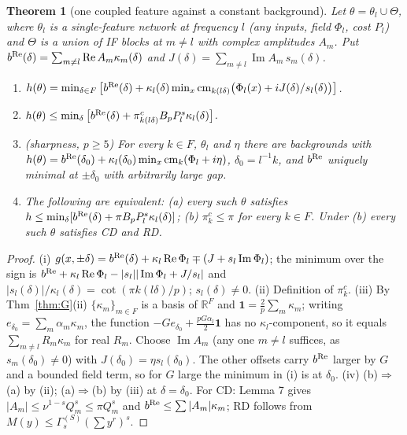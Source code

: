 \documentclass[11pt]{article}
\newtheorem{theorem}{Theorem}
\theoremstyle{remark}
\newcommand{\Re}{\operatorname{Re}}
\newcommand{\Im}{\operatorname{Im}}
\renewcommand{\Re}{\operatorname{Re}}
\renewcommand{\Im}{\operatorname{Im}}
\begin{document}
\begin{theorem}[one coupled feature against a constant background]\label{thm:S}
Let $\theta=\theta_l\cup\Theta$, where $\theta_l$ is a single-feature network at frequency $l$ (any inputs, field $\Phi_l$, cost $P_l$)
and $\Theta$ is a union of IF blocks at $m\ne l$ with complex amplitudes $A_m$.  Put $b^{\rm Re}(\delta)=\sum_{m\ne l}\Re A_m\kappa_m(\delta)$
and $J(\delta)=\sum_{m\ne l}\Im A_m\,s_m(\delta)$.
\begin{enumerate}
\item[(i)] $h(\theta)=\min_{\delta\in F}\big[b^{\rm Re}(\delta)+\kappa_l(\delta)\min_x\mathrm{cm}_{k(l\delta)}\big(\Phi_l(x)+iJ(\delta)/s_l(\delta)\big)\big]$.
\item[(ii)] $h(\theta)\le\min_\delta\big[b^{\rm Re}(\delta)+\pi^c_{k(l\delta)}B_pP_l^s\kappa_l(\delta)\big]$.
\item[(iii)] (sharpness, $p\ge5$) For every $k\in F$, $\theta_l$ and $\eta$ there are backgrounds with
$h(\theta)=b^{\rm Re}(\delta_0)+\kappa_l(\delta_0)\min_x\mathrm{cm}_k(\Phi_l+i\eta)$, $\delta_0=l^{-1}k$, and $b^{\rm Re}$ uniquely minimal at
$\pm\delta_0$ with arbitrarily large gap.
\item[(iv)] The following are equivalent: (a) every such $\theta$ satisfies $h\le\min_\delta[b^{\rm Re}(\delta)+\pi B_pP_l^s\kappa_l(\delta)]$;
(b) $\pi^c_k\le\pi$ for every $k\in F$.  Under (b) every such $\theta$ satisfies CD and RD.
\end{enumerate}
\end{theorem}
\begin{proof}
(i) $g(x,\pm\delta)=b^{\rm Re}(\delta)+\kappa_l\Re\Phi_l\mp(J+s_l\Im\Phi_l)$; the minimum over the sign is
$b^{\rm Re}+\kappa_l\Re\Phi_l-|s_l||\Im\Phi_l+J/s_l|$ and $|s_l(\delta)|/\kappa_l(\delta)=\cot(\pi k(l\delta)/p)$; $s_l(\delta)\ne0$.
(ii) Definition of $\pi^c_k$.  (iii) By Thm~\ref{thm:G}(ii) $\{\kappa_m\}_{m\in F}$ is a basis of $\mathbb R^F$ and
$\mathbf 1=\frac2p\sum_m\kappa_m$; writing $e_{\delta_0}=\sum_m\alpha_m\kappa_m$, the function $-Ge_{\delta_0}+\frac{pG\alpha_l}2\mathbf 1$ has no
$\kappa_l$-component, so it equals $\sum_{m\ne l}R_m\kappa_m$ for real $R_m$.  Choose $\Im A_m$ (any one $m\ne l$ suffices, as
$s_m(\delta_0)\ne0$) with $J(\delta_0)=\eta s_l(\delta_0)$.  The other offsets carry $b^{\rm Re}$ larger by $G$ and a bounded field
term, so for $G$ large the minimum in (i) is at $\delta_0$.  (iv) (b)$\Rightarrow$(a) by (ii); (a)$\Rightarrow$(b) by (iii) at
$\delta=\delta_0$.  For CD: Lemma 7 gives $|A_m|\le\nu^{1-s}Q_m^s\le\pi Q_m^s$ and $b^{\rm Re}\le\sum|A_m|\kappa_m$; RD follows from
$M(y)\le\Gamma^{(S)}_s(\sum y^r)^s$.
\end{proof}
\end{document}
